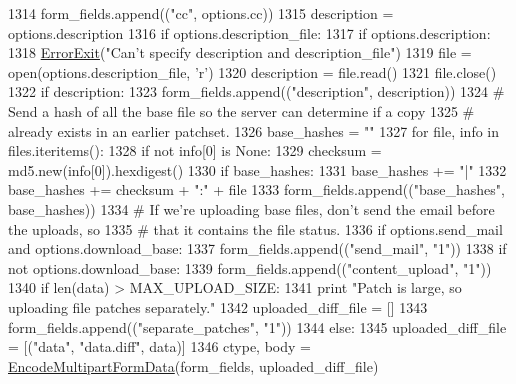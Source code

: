 \begin{DoxyCode}
{{{{1314     form\_fields.append((\textcolor{stringliteral}{"cc"}, options.cc))
1315   description = options.description
1316   \textcolor{keywordflow}{if} options.description\_file:
1317     \textcolor{keywordflow}{if} options.description:
1318       \hyperlink{namespaceupload_adea53186a1d73e92cc839b7c35c2c044}{ErrorExit}(\textcolor{stringliteral}{"Can't specify description and description\_file"})
1319     file = open(options.description\_file, \textcolor{stringliteral}{'r')}
1320 \textcolor{stringliteral}{    description = file.read()}
1321 \textcolor{stringliteral}{    file.close()}
1322 \textcolor{stringliteral}{  }\textcolor{keywordflow}{if} description:
1323     form\_fields.append((\textcolor{stringliteral}{"description"}, description))
1324   \textcolor{comment}{# Send a hash of all the base file so the server can determine if a copy}
1325   \textcolor{comment}{# already exists in an earlier patchset.}
1326   base\_hashes = \textcolor{stringliteral}{""}
1327   \textcolor{keywordflow}{for} file, info \textcolor{keywordflow}{in} files.iteritems():
1328     \textcolor{keywordflow}{if} \textcolor{keywordflow}{not} info[0] \textcolor{keywordflow}{is} \textcolor{keywordtype}{None}:
1329       checksum = md5.new(info[0]).hexdigest()
1330       \textcolor{keywordflow}{if} base\_hashes:
1331         base\_hashes += \textcolor{stringliteral}{"|"}
1332       base\_hashes += checksum + \textcolor{stringliteral}{":"} + file
1333   form\_fields.append((\textcolor{stringliteral}{"base\_hashes"}, base\_hashes))
1334   \textcolor{comment}{# If we're uploading base files, don't send the email before the uploads, so}
1335   \textcolor{comment}{# that it contains the file status.}
1336   \textcolor{keywordflow}{if} options.send\_mail \textcolor{keywordflow}{and} options.download\_base:
1337     form\_fields.append((\textcolor{stringliteral}{"send\_mail"}, \textcolor{stringliteral}{"1"}))
1338   \textcolor{keywordflow}{if} \textcolor{keywordflow}{not} options.download\_base:
1339     form\_fields.append((\textcolor{stringliteral}{"content\_upload"}, \textcolor{stringliteral}{"1"}))
1340   \textcolor{keywordflow}{if} len(data) > MAX\_UPLOAD\_SIZE:
1341     \textcolor{keywordflow}{print} \textcolor{stringliteral}{"Patch is large, so uploading file patches separately."}
1342     uploaded\_diff\_file = []
1343     form\_fields.append((\textcolor{stringliteral}{"separate\_patches"}, \textcolor{stringliteral}{"1"}))
1344   \textcolor{keywordflow}{else}:
1345     uploaded\_diff\_file = [(\textcolor{stringliteral}{"data"}, \textcolor{stringliteral}{"data.diff"}, data)]
1346   ctype, body = \hyperlink{namespaceupload_ae12985a2c860c124c502dd2099b702eb}{EncodeMultipartFormData}(form\_fields, uploaded\_diff\_file)
}}}}
\end{DoxyCode}
